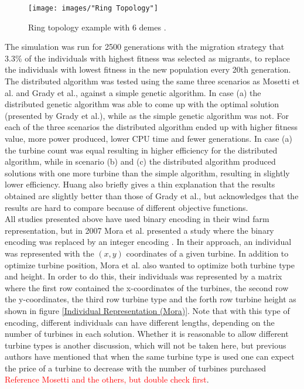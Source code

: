 \begin{figure}[h!]
\begin{center}
\texttt{[image: images/"Ring Topology"]}
\caption{Ring topology example with 6 demes \citep{Huang}.}
\label{Ring Topology}
\end{center}
\end{figure}


\noindent The simulation was run for 2500 generations with the migration strategy that 3.3\% of the individuals with highest fitness was selected as migrants, to replace the individuals with lowest fitness in the new population every 20th generation. The distributed algorithm was tested using the same three scenarios as Mosetti et al. and Grady et al., against a simple genetic algorithm. In case (a) the distributed genetic algorithm was able to come up with the optimal solution (presented by Grady et al.), while as the simple genetic algorithm was not. For each of the three scenarios the distributed algorithm ended up with higher fitness value, more power produced, lower CPU time and fewer generations. In case (a) the turbine count was equal resulting in higher efficiency for the distributed algorithm, while in scenario (b) and (c) the distributed algorithm produced solutions with one more turbine than the simple algorithm, resulting in slightly lower efficiency. Huang also briefly gives a thin explanation that the results obtained are slightly better than those of Grady et al., but acknowledges that the results are hard to compare because of different objective functions.\\


All studies presented above have used binary encoding in their wind farm representation, but in 2007 Mora et al. presented a study where the binary encoding was replaced by an integer encoding \citep{Mora}. In their approach, an individual was represented with the $(x, y)$ coordinates of a given turbine. In addition to optimize turbine position, Mora et al. also wanted to optimize both turbine type and height. In order to do this, their individuals was represented by a matrix where the first row contained the x-coordinates of the turbines, the second row the y-coordinates, the third row turbine type and the forth row turbine height as shown in figure \ref{Individual Representation (Mora)}. Note that with this type of encoding, different individuals can have different lengths, depending on the number of turbines in each solution. Whether it is reasonable to allow different turbine types is another discussion, which will not be taken here, but previous authors have mentioned that when the same turbine type is used one can expect the price of a turbine to decrease with the number of turbines purchased \textcolor{red}{Reference Mosetti and the others, but double check first}. \\


